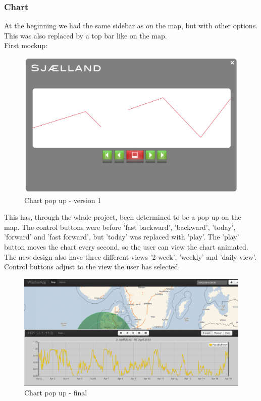 \subsubsection{Chart}
At the beginning we had the same sidebar as on the map, but with other options. This was also replaced by a top bar like on the map.\\
First mockup: 
\begin{figure}[htbp]
   \centering
   \includegraphics[width=1\linewidth]{figure/design_chart_v1.eps}
   \caption{Chart pop up - version 1}
\end{figure}

This has, through the whole project, been determined to be a pop up on the map.
The control buttons were before 'fast backward', 'backward', 'today', 'forward' and 'fast forward', but 'today' was replaced with 'play'. The 'play' button moves the chart every second, so the user can view the chart animated.\\
The new design also have three different views '2-week', 'weekly' and 'daily view'. Control buttons adjust to the view the user has selected.

\begin{figure}[htbp]
   \centering
   \includegraphics[width=1\linewidth]{figure/design_chart_final.eps}
   \caption{Chart pop up - final}
\end{figure}